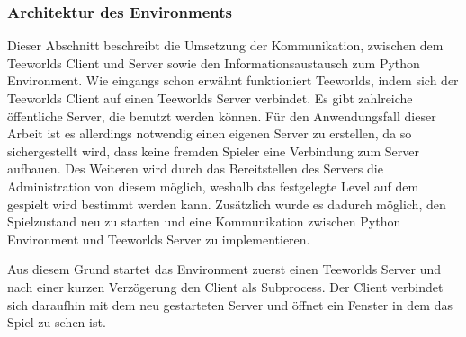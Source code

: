 \documentclass[11pt]{scrartcl}
\begin{document}
\subsubsection{Architektur des Environments}
\label{sec:architecture-env}
Dieser Abschnitt beschreibt die Umsetzung der Kommunikation, zwischen dem Teeworlds Client
und Server sowie den Informationsaustausch zum Python Environment. Wie eingangs schon
erwähnt funktioniert Teeworlds, indem sich der Teeworlds Client auf einen Teeworlds Server
verbindet. Es gibt zahlreiche öffentliche Server, die benutzt werden können. Für den
Anwendungsfall dieser Arbeit ist es allerdings notwendig einen eigenen Server zu erstellen,
da so sichergestellt wird, dass keine fremden Spieler eine Verbindung zum Server aufbauen.
Des Weiteren wird durch das Bereitstellen des Servers die Administration von diesem möglich,
weshalb das festgelegte Level auf dem gespielt wird bestimmt werden kann. Zusätzlich wurde
es dadurch möglich, den Spielzustand neu zu starten und eine Kommunikation zwischen Python
Environment und Teeworlds Server zu implementieren.

Aus diesem Grund startet das Environment zuerst einen Teeworlds Server und nach einer
kurzen Verzögerung den Client als Subprocess. Der Client verbindet sich daraufhin mit dem
neu gestarteten Server und öffnet ein Fenster in dem das Spiel zu sehen ist.
\end{document}
